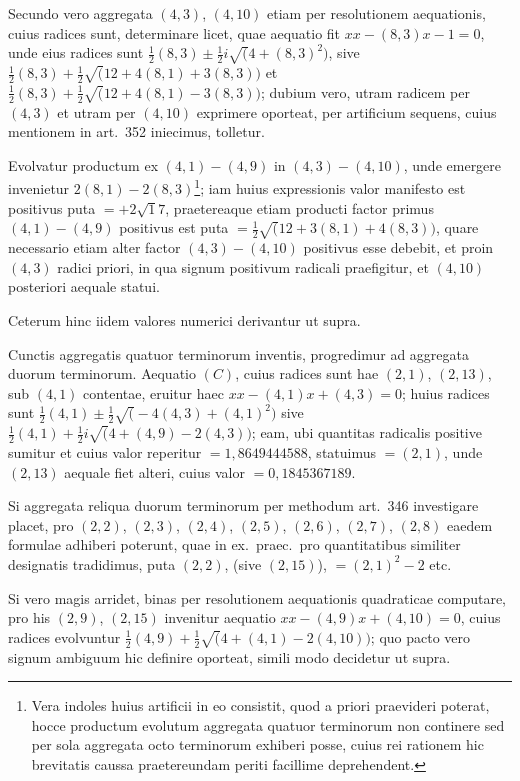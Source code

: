 \documentclass[12pt,a4paper]{article}
\theoremstyle{plain}
\theoremstyle{definition}
\theoremstyle{remark}
\begin{document}
Secundo vero aggregata $(4,3)$, $(4,10)$ etiam per resolutionem aequationis, cuius radices sunt, determinare licet, quae aequatio fit $xx-(8,3)x-1=0$, unde eius radices sunt $\frac{1}{2}(8,3)\pm\frac{1}{2}i\surd(4+(8,3)^2)$, sive $\frac{1}{2}(8,3)+\frac{1}{2}\surd(12+4(8,1)+3(8,3))$ et $\frac{1}{2}(8,3)+\frac{1}{2}\surd(12+4(8,1)-3(8,3))$; dubium vero, utram radicem per $(4,3)$ et utram per $(4,10)$ exprimere oporteat, per artificium sequens, cuius mentionem in art.\ 352 iniecimus, tolletur.

Evolvatur productum ex $(4,1)-(4,9)$ in $(4,3)-(4,10)$, unde emergere invenietur $2(8,1)-2(8,3)$\footnote{Vera indoles huius artificii in eo consistit, quod a priori praevideri poterat, hocce productum evolutum aggregata quatuor terminorum non continere sed per sola aggregata octo terminorum exhiberi posse, cuius rei rationem hic brevitatis caussa praetereundam periti facillime deprehendent.}; iam huius expressionis valor manifesto est positivus puta $=+2\surd 17$, praetereaque etiam producti factor primus $(4,1)-(4,9)$ positivus est puta $=\frac{1}{2}\surd(12+3(8,1)+4(8,3))$, quare necessario etiam alter factor $(4,3)-(4,10)$ positivus esse debebit, et proin $(4,3)$ radici priori, in qua signum positivum radicali praefigitur, et $(4,10)$ posteriori aequale statui.

Ceterum hinc iidem valores numerici derivantur ut supra.

Cunctis aggregatis quatuor terminorum inventis, progredimur ad aggregata duorum terminorum. Aequatio $(C)$, cuius radices sunt hae $(2,1)$, $(2,13)$, sub $(4,1)$ contentae, eruitur haec $xx-(4,1)x+(4,3)=0$; huius radices sunt $\frac{1}{2}(4,1)\pm\frac{1}{2}\surd(-4(4,3)+(4,1)^2)$ sive $\frac{1}{2}(4,1)+\frac{1}{2}i\surd(4+(4,9)-2(4,3))$; eam, ubi quantitas radicalis positive sumitur et cuius valor reperitur $=1{,}8649444588$, statuimus $=(2,1)$, unde $(2,13)$ aequale fiet alteri, cuius valor $=0{,}1845367189$.

Si aggregata reliqua duorum terminorum per methodum art.\ 346 investigare placet, pro $(2,2)$, $(2,3)$, $(2,4)$, $(2,5)$, $(2,6)$, $(2,7)$, $(2,8)$ eaedem formulae adhiberi poterunt, quae in ex.\ praec.\ pro quantitatibus similiter designatis tradidimus, puta $(2,2)$, (sive $(2,15)$), $=(2,1)^2-2$ etc.

Si vero magis arridet, binas per resolutionem aequationis quadraticae computare, pro his $(2,9)$, $(2,15)$ invenitur aequatio $xx-(4,9)x+(4,10)=0$, cuius radices evolvuntur $\frac{1}{2}(4,9)+\frac{1}{2}\surd(4+(4,1)-2(4,10))$; quo pacto vero signum ambiguum hic definire oporteat, simili modo decidetur ut supra.
\end{document}
